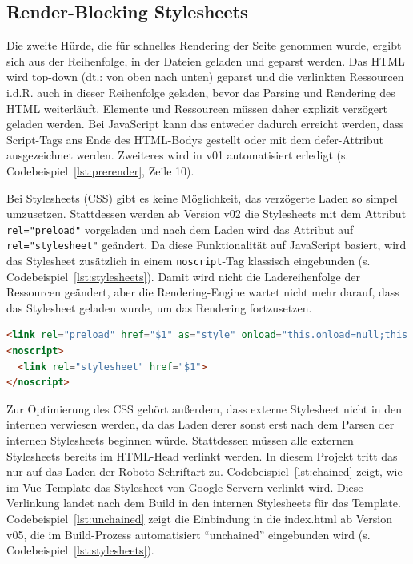 \documentclass[11pt,a4paper]{article}
\begin{document}
\subsection{Render-Blocking Stylesheets}
Die zweite Hürde, die für schnelles Rendering der Seite genommen wurde, ergibt sich aus der Reihenfolge, in der Dateien geladen und geparst werden.
Das HTML wird top-down (dt.: von oben nach unten) geparst und die verlinkten Ressourcen i.d.R. auch in dieser Reihenfolge geladen, bevor das Parsing und Rendering des HTML weiterläuft.
Elemente und Ressourcen müssen daher explizit verzögert geladen werden.
Bei JavaScript kann das entweder dadurch erreicht werden, dass Script-Tags ans Ende des HTML-Bodys gestellt oder mit dem defer-Attribut ausgezeichnet werden.
Zweiteres wird in v01 automatisiert erledigt (s. Codebeispiel~\ref{lst:prerender}, Zeile 10).

Bei Stylesheets (CSS) gibt es keine Möglichkeit, das verzögerte Laden so simpel umzusetzen.
Stattdessen werden ab Version v02 die Stylesheets mit dem Attribut \verb|rel="preload"| vorgeladen und nach dem Laden wird das Attribut auf \verb|rel="stylesheet"| geändert.
Da diese Funktionalität auf JavaScript basiert, wird das Stylesheet zusätzlich in einem \verb|noscript|-Tag klassisch eingebunden (s. Codebeispiel~\ref{lst:stylesheets}). 
Damit wird nicht die Ladereihenfolge der Ressourcen geändert, aber die Rendering-Engine wartet nicht mehr darauf, dass das Stylesheet geladen wurde, um das Rendering fortzusetzen.

\begin{lstlisting}[language=html, caption={Entfernte Render-Blocking Stylesheets (\enquote{\$1} steht für den jeweiligen Quellpfad für das Stylesheet)}, label={lst:stylesheets}]
<link rel="preload" href="$1" as="style" onload="this.onload=null;this.rel='stylesheet'">
<noscript>
  <link rel="stylesheet" href="$1">
</noscript>
\end{lstlisting}

Zur Optimierung des CSS gehört außerdem, dass externe Stylesheet nicht in den internen verwiesen werden, da das Laden derer sonst erst nach dem Parsen der internen Stylesheets beginnen würde.
Stattdessen müssen alle externen Stylesheets bereits im HTML-Head verlinkt werden.
In diesem Projekt tritt das nur auf das Laden der Roboto-Schriftart zu.
Codebeispiel~\ref{lst:chained} zeigt, wie im Vue-Template das Stylesheet von Google-Servern verlinkt wird.
Diese Verlinkung landet nach dem Build in den internen Stylesheets für das Template.
Codebeispiel~\ref{lst:unchained} zeigt die Einbindung in die index.html ab Version v05, die im Build-Prozess automatisiert \enquote{unchained} eingebunden wird (s. Codebeispiel~\ref{lst:stylesheets}).
\end{document}
